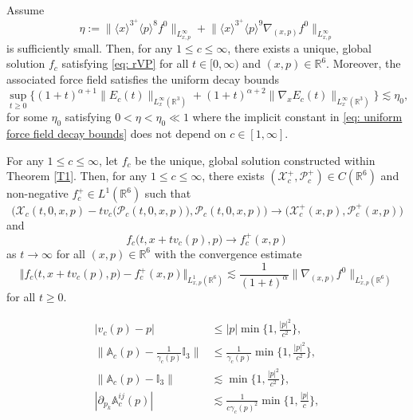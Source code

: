 \documentclass[10pt,a4paper]{amsart}
\newcommand{\R}{\mathbb{R}}
\begin{document}
\begin{theorem}
\label{T1}
Assume
\begin{equation}\label{eq: initial data assumption}
\eta:=\Big\|\langle x\rangle^{3^+}\langle p \rangle^8 f^0\Big\|_{L_{x,p}^\infty} +\Big\|\langle x\rangle^{3^+}\langle p \rangle^9\nabla_{(x,p)}f^0\Big\|_{L_{x,p}^\infty}
\end{equation}
is sufficiently small. Then, for any $1 \leq c \leq \infty$, there exists a unique, global solution $f_c$ satisfying \eqref{eq: rVP} for all $t \in [0,\infty)$ and $(x,p) \in \mathbb{R}^6$. Moreover, the associated force field satisfies the uniform decay bounds
\begin{equation}\label{eq: uniform force field decay bounds}
\sup_{t\geq0}\Big\{(1+t)^{\alpha+1}\|E_c(t)\|_{L_x^\infty(\mathbb{R}^3)}+(1+t)^{\alpha+2}\|\nabla_x E_c(t)\|_{L_x^\infty(\mathbb{R}^3)}\Big\}\lesssim\eta_0,
\end{equation}
for some $\eta_0$ satisfying $0 < \eta < \eta_0 \ll 1$ where the implicit constant in \eqref{eq: uniform force field decay bounds} does not depend on $c\in [1,\infty]$.
\end{theorem}

\begin{theorem}[Scattering]
\label{T2}
For any $1 \leq c \leq \infty$, let $f_c$ be the unique, global solution constructed within Theorem \ref{T1}.
Then, for any $1 \leq c \leq \infty$, there exists $(\mathcal{X}_c^+,  \mathcal{P}_c^+) \in C(\mathbb{R}^6)$ and non-negative $f_c^+ \in L^1(\mathbb{R}^6)$ such that 
$$\Big(\mathcal{X}_c(t,0,x,p)-tv_c\big(\mathcal{P}_c(t,0,x,p)\big), \mathcal{P}_c(t,0,x,p)\Big) \to \big(\mathcal{X}_c^+(x,p), \mathcal{P}_c^+(x,p)\big)$$
and
$$f_c\Big(t,x+tv_c(p),p\Big) \to f_c^+(x,p)$$
as $t \to \infty$ for all $(x,p) \in \R^6$  with the convergence estimate
$$ \Big\Vert f_c\Big(t,x+tv_c(p),p\Big) - f_c^+(x,p)\Big\Vert_{L^1_{x,p}(\mathbb{R}^6)} \lesssim \frac{1}{(1+t)^\alpha}\|\nabla_{(x,p)}f^0\|_{L_{x,p}^1(\mathbb{R}^6)}$$
for all $t \geq 0$.
\end{theorem}

\begin{align}
|v_c(p)-p|&\leq|p|\min\bigg\{1,\frac{|p|^2}{c^2}\bigg\},\label{eq: vc asymptotic}\\
\bigg\|\mathbb{A}_c(p)-\frac{1}{\gamma_c(p)}\mathbb{I}_3\bigg\|&\leq\frac{1}{\gamma_c(p)}\min\bigg\{1,\frac{|p|^2}{c^2}\bigg\},\label{eq: Ac asymptotic}\\
\bigg\|\mathbb{A}_c(p)-\mathbb{I}_3\bigg\|&\lesssim\min\bigg\{1,\frac{|p|^2}{c^2}\bigg\},\label{eq: Ac asymptotic'}\\
|\partial_{p_k}\mathbb{A}_c^{ij}(p)|&\lesssim\frac{1}{c\gamma_c(p)^2}\min\bigg\{1,\frac{|p|}{c}\bigg\},\label{eq: Ac  derivative asymptotic}
\end{align}
\end{document}
